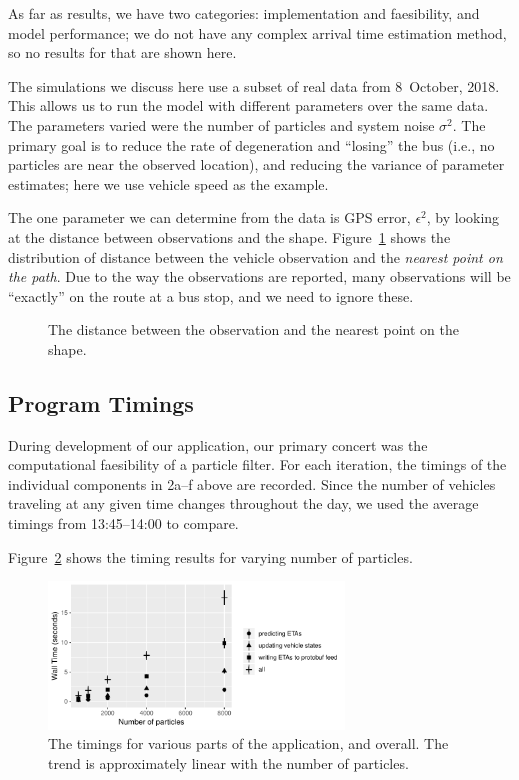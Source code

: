 As far as results, we have two categories:
implementation and faesibility,
and model performance;
we do not have any complex arrival time estimation method,
so no results for that are shown here.


The simulations we discuss here use a subset of real data from 8~October, 2018.
This allows us to run the model with different parameters over the same data.
The parameters varied were the number of particles and system noise $\sigma^2$.
The primary goal is to reduce the rate of degeneration and ``losing'' the bus 
(i.e., no particles are near the observed location),
and reducing the variance of parameter estimates; here we use vehicle speed as the example.


The one parameter we can determine from the data is GPS error, $\epsilon^2$,
by looking at the distance between observations and the shape.
Figure~\ref{fig:gps_dist} shows the distribution of distance between the vehicle
observation and the \emph{nearest point on the path}.
Due to the way the observations are reported, 
many observations will be ``exactly'' on the route at a bus stop,
and we need to ignore these.

\begin{figure}[tb]
    \centering
    \caption{The distance between the observation and the nearest point on the shape.}
    \label{fig:gps_dist}
\end{figure}



\subsection{Program Timings}
\label{sec:timings}

During development of our application,
our primary concert was the computational faesibility of a particle filter.
For each iteration, 
the timings of the individual components in 2a--f above are recorded.
Since the number of vehicles traveling at any given time changes throughout the day,
we used the average timings from 13:45--14:00 to compare.


Figure~\ref{fig:timings} shows the timing results for varying number of particles.


\begin{figure}[tb]
    \centering
    \includegraphics[width=0.7\textwidth]{figures/04_model_results_timing.pdf}
    \caption{The timings for various parts of the application, and overall. %
        The trend is approximately linear with the number of particles.}
    \label{fig:timings}
\end{figure}




